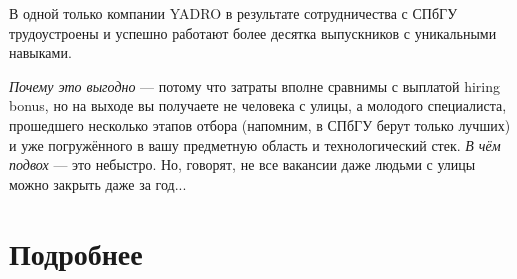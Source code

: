 \documentclass[a5paper]{article}
\begin{document}
В одной только компании YADRO в результате сотрудничества с СПбГУ трудоустроены и успешно работают более десятка выпускников с уникальными навыками.

\emph{Почему это выгодно} --- потому что затраты вполне сравнимы с выплатой hiring bonus, но на выходе вы получаете не человека с улицы, а молодого специалиста, прошедшего несколько этапов отбора (напомним, в СПбГУ берут только лучших) и уже погружённого в вашу предметную область и технологический стек. \emph{В чём подвох} --- это небыстро. Но, говорят, не все вакансии даже людьми с улицы можно закрыть даже за год...

\section*{Подробнее}
\end{document}
